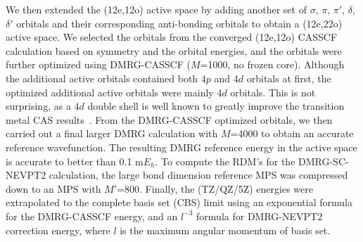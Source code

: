 We then extended the (12e,12o) active space by adding another set of $\sigma$, $\pi$, $\pi'$, $\delta$, $\delta'$ orbitals and their corresponding anti-bonding orbitals 
to obtain a (12e,22o) active space. We selected the orbitals from the converged (12e,12o) CASSCF calculation based on symmetry and the orbital energies,
and the orbitals were further optimized using DMRG-CASSCF ($M$=1000, no frozen core). Although the additional active orbitals contained both $4p$ and $4d$ orbitals at first, 
the optimized additional active orbitals were mainly $4d$ orbitals.  This is not surprising, as a $4d$ double shell is well known to greatly improve the transition metal CAS results~\cite{andersson_excitation_1992}.
From the DMRG-CASSCF optimized orbitals, we then carried out a final larger DMRG calculation with $M$=4000 to obtain an accurate reference wavefunction.
The resulting DMRG reference energy in the active space is accurate to better than 0.1 m$E_h$.
To compute the RDM's for the DMRG-SC-NEVPT2 calculation, the large bond dimension reference MPS was compressed down to an MPS with $M'$=800. 
Finally, the (TZ/QZ/5Z) energies were extrapolated to the complete basis set (CBS) limit using
an exponential formula for the DMRG-CASSCF energy, and an $l^{-3}$ formula for DMRG-NEVPT2 correction energy, where $l$ is the maximum angular momentum of basis set.

